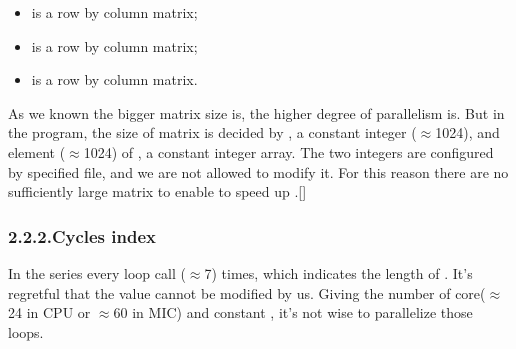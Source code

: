 \documentclass{article}
\begin{document}
\begin{itemize}[noitemsep,topsep=\mdcompacttopsep]%

\item{} is a  row by  column matrix;%

\item{} is a  row by  column matrix;%

\item{} is a  row by  column matrix.%
\end{itemize}%

\noindent{}As we known the bigger matrix size is, the higher degree of  parallelism is. But in the  program, the size of matrix is decided by , a constant integer (\ensuremath{\approx}1024), and element (\ensuremath{\approx}1024) of , a constant integer array. The two integers are configured by specified file, and we are not allowed to modify it. For this reason there are no sufficiently large matrix to enable  to speed up .[]%

\subsubsection{2.2.2.\hspace*{0.5em}Cycles index}\label{sec-cycles-index}%

\noindent{}In the  series every loop call  (\ensuremath{\approx}7) times, which indicates the length of . It's regretful that the value cannot be modified by us. Giving the number of core(\ensuremath{\approx}24 in CPU or \ensuremath{\approx}60 in MIC) and constant , it's not wise to parallelize those loops.%
\end{document}
